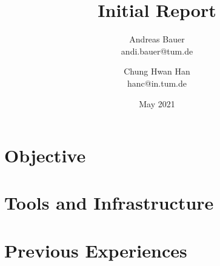 \documentclass[a4paper, 11pt]{article}
\title{Initial Report}
\author{
    Andreas Bauer\\
    andi.bauer@tum.de
  \and
    Chung Hwan Han\\
    hanc@in.tum.de
}
\date{May 2021}
\begin{document}
    \maketitle

    \section{Objective}\label{sec:objective}

    \section{Tools and Infrastructure}\label{sec:tools-and-infrastructure} %


    \section{Previous Experiences}\label{sec:previous-experiences}

\end{document}

